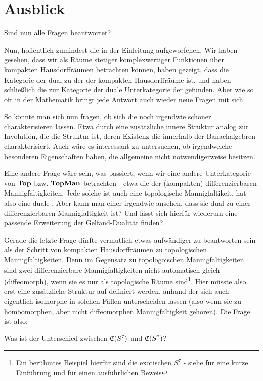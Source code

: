 {}
\section*{Ausblick}
\begin{center}
Sind nun alle Fragen beantwortet?
\end{center}

Nun, hoffentlich zumindest die in der Einleitung aufgeworfenen. Wir haben gesehen, dass wir \CAlgn{} als Räume stetiger komplexwertiger Funktionen über kompakten Hausdorffräumen betrachten können, haben gezeigt, dass die Kategorie der \CAlgn{} dual zu der der kompakten Hausdorffräume ist, und haben schließlich die zur Kategorie der \komTopMann{} duale Unterkategorie der \CAlgn{} gefunden. Aber wie so oft in der Mathematik bringt jede Antwort auch wieder neue Fragen mit sich.

So könnte man sich nun fragen, ob sich die \CAlgMann{} noch irgendwie \glqq schöner\grqq{} charakterisieren lassen. Etwa durch eine zusätzliche innere Struktur analog zur Involution, die die Struktur ist, deren Existenz die \CAlgn{} innerhalb der Banachalgebren charakterisiert. Auch wäre es interessant zu untersuchen, ob \CAlgMann{} irgendwelche besonderen Eigenschaften haben, die allgemeine \CAlgn{} nicht notwendigerweise besitzen.

Eine andere Frage wäre sein, was passiert, wenn wir eine andere Unterkategorie von $\mathbf{Top}$ bzw. $\mathbf{TopMan}$ betrachten - etwa die der (kompakten) differenzierbaren Mannigfaltigkeiten. Jede solche ist auch eine topologische Mannigfaltikeit, hat also eine duale \CAlgMan{}. Aber kann man einer \CAlgMan{} irgendwie ansehen, dass sie dual zu einer differenzierbaren Mannigfaltigkeit ist? Und lässt sich hierfür wiederum eine passende Erweiterung der Gelfand-Dualität finden? 

Gerade die letzte Frage dürfte vermutlich etwas aufwändiger zu beantworten sein als der Schritt von kompakten Hausdorffräumen zu topologischen Mannigfaltigkeiten. Denn im Gegensatz zu topologoischen Mannigfaltigkeiten sind zwei differenzierbare Mannigfaltigkeiten nicht automatisch \glqq gleich\grqq{} (diffeomorph), wenn sie es nur als topologische Räume sind\footnote{Ein berühmtes Beispiel hierfür sind die exotischen $S^7$ - siehe \cite{Elwes2011} für eine kurze Einführung und \cite{Bognat2011} für einen ausführlichen Beweis}. Hier müsste also erst eine zusätzliche Struktur auf \CAlgn{} definiert werden, anhand der sich auch eigentlich isomorphe \CAlgn{} in solchen Fällen unterscheiden lassen (also wenn sie zu homöomorphen, aber nicht diffeomorphen Mannigfaltigkeit \glqq gehören\grqq). Die Frage ist also:

\begin{center}
Was ist der Unterschied zwischen $\mathfrak{C}(S^7)$ und $\mathfrak{C}(S^7)$?
\end{center}